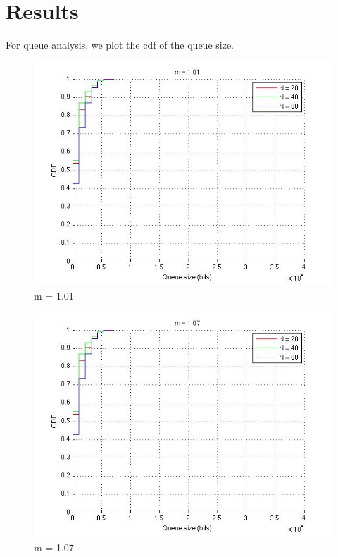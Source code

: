 \section{Results}
  For queue analysis, we plot the cdf of the queue size.

  \begin{figure}[h]
    \includegraphics[scale=0.55]{img/m101.jpg}
    \caption{m = 1.01}
  \end{figure}

  \begin{figure}[h]
    \includegraphics[scale=0.55]{img/m107.jpg}
    \caption{m = 1.07}
  \end{figure}

